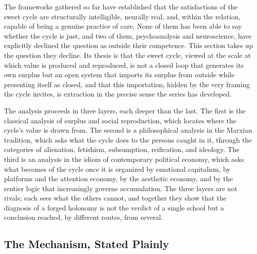 \documentclass[11pt,a4paper]{article}
\begin{document}
The frameworks gathered so far have established that the satisfactions of the sweet cycle are structurally intelligible, neurally real, and, within the relation, capable of being a genuine practice of care. None of them has been able to say whether the cycle is just, and two of them, psychoanalysis and neuroscience, have explicitly declined the question as outside their competence. This section takes up the question they decline. Its thesis is that the sweet cycle, viewed at the scale at which value is produced and reproduced, is not a closed loop that generates its own surplus but an open system that imports its surplus from outside while presenting itself as closed, and that this importation, hidden by the very framing the cycle invites, is extraction in the precise sense the series has developed.

The analysis proceeds in three layers, each deeper than the last. The first is the classical analysis of surplus and social reproduction, which locates where the cycle's value is drawn from. The second is a philosophical analysis in the Marxian tradition, which asks what the cycle does to the persons caught in it, through the categories of alienation, fetishism, subsumption, reification, and ideology. The third is an analysis in the idiom of contemporary political economy, which asks what becomes of the cycle once it is organized by emotional capitalism, by platforms and the attention economy, by the aesthetic economy, and by the rentier logic that increasingly governs accumulation. The three layers are not rivals; each sees what the others cannot, and together they show that the diagnosis of a forged holonomy is not the verdict of a single school but a conclusion reached, by different routes, from several.

\subsection{The Mechanism, Stated Plainly}
\end{document}
